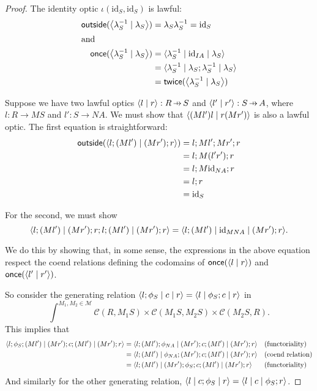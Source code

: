 \documentclass[11pt,a4paper]{article}
\theoremstyle{plain}
\theoremstyle{definition}
\newcommand{\C}{\mathscr{C}}
\newcommand{\M}{\mathscr{M}}
\newcommand{\id}{\mathrm{id}}
\newcommand{\rep}[2]{{\ensuremath \left\langle #1 \mid #2 \right\rangle}}
\newcommand{\repthree}[3]{{\ensuremath \langle #1 \mid #2 \mid #3 \rangle}}
\newcommand{\outside}{\mathsf{outside}}
\newcommand{\once}{\mathsf{once}}
\newcommand{\twice}{\mathsf{twice}}
\newcommand{\hto}{\ensuremath{\,\mathaccent\shortmid\rightarrow\,}}
\begin{document}
\begin{proof}
  The identity optic $\iota(\id_S, \id_S)$ is lawful:
  \begin{align*}
    \outside(\rep{\lambda^{-1}_S}{\lambda_{S}}) &= \lambda_{S} \lambda^{-1}_S = \id_S \\
    \intertext{and}
    \once(\rep{\lambda^{-1}_S}{\lambda_{S}})
                                                          &= \repthree{\lambda^{-1}_S}{\id_{IA}}{\lambda_{S}} \\
                                                          &= \repthree{\lambda^{-1}_S}{\lambda_{S};\lambda^{-1}_S}{\lambda_{S}} \\
                                                          &= \twice(\rep{\lambda^{-1}_S}{\lambda_{S}})
  \end{align*}

  Suppose we have two lawful optics $\rep{l}{r} : R \hto S$ and $\rep{l'}{r'} : S \hto A$, where $l : R \to MS$ and $l' : S \to NA$. We must show that $\rep{(Ml')l}{r (Mr') }$ is also a lawful optic. The first equation is straightforward:
  \begin{align*}
    \outside(\rep{l; (Ml')}{(Mr') ; r  })
    &= l ; Ml' ; Mr' ; r \\
    &= l ; M(l'r') ; r \\
    &= l ; M\id_{NA} ; r \\
    &= l ; r \\
    &= \id_S
  \end{align*}

  For the second, we must show
  \[ \repthree{ l;(Ml')}{(Mr'); r;l;(Ml')}{(Mr') ; r } = \repthree{l;(Ml')}{\id_{MNA}}{(Mr') ; r }. \]

  We do this by showing that, in some sense, the expressions in the above equation respect the coend relations defining the codomains of $\once(\rep{l}{r})$ and $\once(\rep{l'}{r'})$.

  So consider the generating relation $\repthree{ l;\phi_S}{c}{r} = \repthree{l}{\phi_S ; c}{r}$ in \[\int^{M_1, M_2 \in \M} \C(R, M_1 S) \times \C(M_1 S, M_2 S) \times \C(M_2 S, R).\]
  This implies that
  \begin{align*}
    \repthree{l;\phi_S;(Ml')}{(Mr'); c ;(Ml')}{(Mr') ; r}
    &= \repthree{l;(Ml');\phi_{NA}}{(Mr'); c ;(Ml')}{(Mr') ; r} && \text{(functoriality)} \\
    &= \repthree{l;(Ml')}{\phi_{NA};(Mr'); c ;(Ml')}{(Mr') ; r} && \text{(coend relation)} \\
    &= \repthree{l;(Ml')}{(Mr');\phi_{S}; c ;(Ml')}{(Mr') ; r} && \text{(functoriality)}
  \end{align*}
  And similarly for the other generating relation, $\repthree{l}{c;\phi_S}{r } = \repthree{l}{c}{\phi_S; r }$.


\end{proof}
\end{document}
